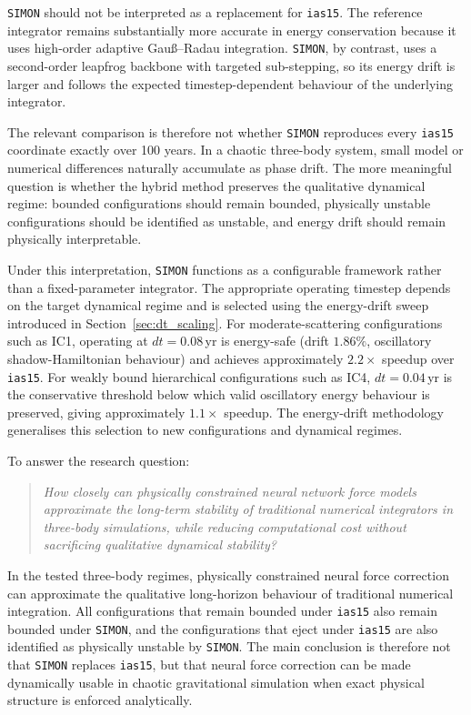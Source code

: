 \documentclass[12pt]{article}
\begin{document}
\texttt{SIMON} should not be interpreted as a replacement for \texttt{ias15}. The reference
integrator remains substantially more accurate in energy conservation because it uses
high-order adaptive Gau\ss--Radau integration. \texttt{SIMON}, by contrast, uses a
second-order leapfrog backbone with targeted sub-stepping, so its energy drift is larger
and follows the expected timestep-dependent behaviour of the underlying integrator.

The relevant comparison is therefore not whether \texttt{SIMON} reproduces every
\texttt{ias15} coordinate exactly over 100 years. In a chaotic three-body system, small
model or numerical differences naturally accumulate as phase drift. The more meaningful
question is whether the hybrid method preserves the qualitative dynamical regime:
bounded configurations should remain bounded, physically unstable configurations should
be identified as unstable, and energy drift should remain physically interpretable.

Under this interpretation, \texttt{SIMON} functions as a configurable
framework rather than a fixed-parameter integrator. The appropriate operating
timestep depends on the target dynamical regime and is selected using the
energy-drift sweep introduced in Section~\ref{sec:dt_scaling}. For
moderate-scattering configurations such as IC1, operating at $dt=0.08$\,yr
is energy-safe (drift $1.86\%$, oscillatory shadow-Hamiltonian behaviour)
and achieves approximately $2.2\times$ speedup over \texttt{ias15}. For
weakly bound hierarchical configurations such as IC4, $dt=0.04$\,yr is the
conservative threshold below which valid oscillatory energy behaviour is
preserved, giving approximately $1.1\times$ speedup. The energy-drift
methodology generalises this selection to new configurations and dynamical
regimes.

To answer the research question:
\begin{quote}
\emph{How closely can physically constrained neural network force models approximate the
long-term stability of traditional numerical integrators in three-body simulations, while
reducing computational cost without sacrificing qualitative dynamical stability?}
\end{quote}

\noindent In the tested three-body regimes, physically constrained neural force correction
can approximate the qualitative long-horizon behaviour of traditional numerical
integration. All configurations that remain bounded under \texttt{ias15} also remain
bounded under \texttt{SIMON}, and the configurations that eject under \texttt{ias15} are
also identified as physically unstable by \texttt{SIMON}. The main conclusion is therefore
not that \texttt{SIMON} replaces \texttt{ias15}, but that neural force correction can be made
dynamically usable in chaotic gravitational simulation when exact physical structure is
enforced analytically.
\end{document}
